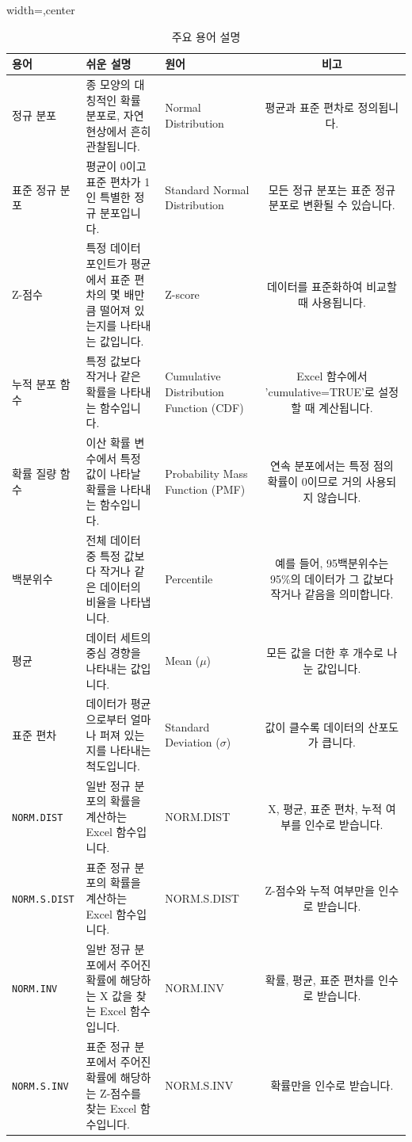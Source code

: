 \documentclass[11pt,a4paper]{book}
\theoremstyle{definition}
\begin{document}
\begin{table}[h!]
\centering
\caption{주요 용어 설명}
\label{tab:glossary}
\begin{adjustbox}{width=\textwidth,center}
\begin{tabular}{lllc}
\toprule
\textbf{용어} & \textbf{쉬운 설명} & \textbf{원어} & \textbf{비고} \\
\midrule
정규 분포 & 종 모양의 대칭적인 확률 분포로, 자연 현상에서 흔히 관찰됩니다. & Normal Distribution & 평균과 표준 편차로 정의됩니다. \\
표준 정규 분포 & 평균이 0이고 표준 편차가 1인 특별한 정규 분포입니다. & Standard Normal Distribution & 모든 정규 분포는 표준 정규 분포로 변환될 수 있습니다. \\
Z-점수 & 특정 데이터 포인트가 평균에서 표준 편차의 몇 배만큼 떨어져 있는지를 나타내는 값입니다. & Z-score & 데이터를 표준화하여 비교할 때 사용됩니다. \\
누적 분포 함수 & 특정 값보다 작거나 같은 확률을 나타내는 함수입니다. & Cumulative Distribution Function (CDF) & Excel 함수에서 'cumulative=TRUE'로 설정할 때 계산됩니다. \\
확률 질량 함수 & 이산 확률 변수에서 특정 값이 나타날 확률을 나타내는 함수입니다. & Probability Mass Function (PMF) & 연속 분포에서는 특정 점의 확률이 0이므로 거의 사용되지 않습니다. \\
백분위수 & 전체 데이터 중 특정 값보다 작거나 같은 데이터의 비율을 나타냅니다. & Percentile & 예를 들어, 95백분위수는 95\%의 데이터가 그 값보다 작거나 같음을 의미합니다. \\
평균 & 데이터 세트의 중심 경향을 나타내는 값입니다. & Mean ($\mu$) & 모든 값을 더한 후 개수로 나눈 값입니다. \\
표준 편차 & 데이터가 평균으로부터 얼마나 퍼져 있는지를 나타내는 척도입니다. & Standard Deviation ($\sigma$) & 값이 클수록 데이터의 산포도가 큽니다. \\
\texttt{NORM.DIST} & 일반 정규 분포의 확률을 계산하는 Excel 함수입니다. & NORM.DIST & X, 평균, 표준 편차, 누적 여부를 인수로 받습니다. \\
\texttt{NORM.S.DIST} & 표준 정규 분포의 확률을 계산하는 Excel 함수입니다. & NORM.S.DIST & Z-점수와 누적 여부만을 인수로 받습니다. \\
\texttt{NORM.INV} & 일반 정규 분포에서 주어진 확률에 해당하는 X 값을 찾는 Excel 함수입니다. & NORM.INV & 확률, 평균, 표준 편차를 인수로 받습니다. \\
\texttt{NORM.S.INV} & 표준 정규 분포에서 주어진 확률에 해당하는 Z-점수를 찾는 Excel 함수입니다. & NORM.S.INV & 확률만을 인수로 받습니다. \\
\bottomrule
\end{tabular}
\end{adjustbox}
\end{table}
\end{document}
